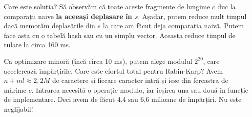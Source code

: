 \documentclass[../main.tex]{subfiles}
\begin{document}
Care este soluția? Să observăm că toate aceste fragmente de lungime $c$ duc la comparații naive \textbf{la aceeași deplasare în $s$}. Așadar, putem reduce mult timpul dacă memorăm deplasările din $s$ la care am făcut deja comparația naivă. Putem face asta cu o tabelă hash sau cu un simplu vector. Aceasta reduce timpul de rulare la circa 160 ms.

Ca optimizare minoră (încă circa 10 ms), putem alege modulul $2^{20}$, care accelerează împărțirile. Care este efortul total pentru Rabin-Karp? Avem $n + ml \approx 2,2 M$ de caractere și fiecare caracter intră și iese din fereastra de mărime $c$. Intrarea necesită o operație modulo, iar ieșirea una sau două în funcție de implementare. Deci avem de făcut 4,4 sau 6,6 milioane de împărțiri. Nu este neglijabil!
\end{document}
